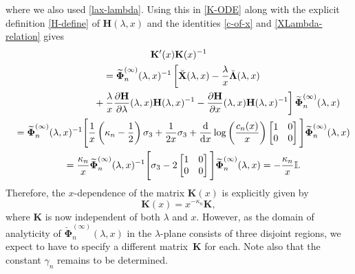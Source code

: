 \documentclass[pdftex]{sigma}
\numberwithin{equation}{section}
\newcommand{\dd}{\mathrm{d}}
\newcommand{\para}[1]{\breve{#1}}
\begin{document}
where we also used \eqref{lax-lambda}.
Using this in \eqref{K-ODE} along with the explicit definition \eqref{H-define} of $\mathbf{H}(\lambda,x)$ and the identities \eqref{c-of-x} and \eqref{XLambda-relation} gives
\begin{gather*}
 \mathbf{K}'(x)\mathbf{K}(x)^{-1}\\
\quad =\widetilde{\boldsymbol{\Phi}}_n^{(\infty)}(\lambda,x)^{-1}\left[\breve{\mathbf{X}}(\lambda,x)-\frac{\lambda}{x}\breve{\boldsymbol{\Lambda}}(\lambda,x)
\right.\\
\left.
\hphantom{\quad =\widetilde{\boldsymbol{\Phi}}_n^{(\infty)}(\lambda,x)^{-1}}{}
+\frac{\lambda}{x}\frac{\partial\mathbf{H}}{\partial\lambda}(\lambda,x)\mathbf{H}(\lambda,x)^{-1}-\frac{\partial\mathbf{H}}{\partial x}(\lambda,x)\mathbf{H}(\lambda,x)^{-1}\right]\widetilde{\boldsymbol{\Phi}}_n^{(\infty)}(\lambda,x)\\
 \quad =\widetilde{\boldsymbol\Phi}_n^{(\infty)}(\lambda,x)^{-1}\Bigg[\frac{1}{x}\left(\kappa_n-\frac{1}{2}\right)\sigma_3 +\frac{1}{2x}\sigma_3+\frac{\dd}{\dd x}\log\left(\frac{c_n(x)}{x}\right)\begin{bmatrix}1&0\\0&0\end{bmatrix}\Bigg]\widetilde{\boldsymbol{\Phi}}_n^{(\infty)}(\lambda,x)\\
 \quad=\frac{\kappa_n}{x}\widetilde{\boldsymbol{\Phi}}_n^{(\infty)}(\lambda,x)^{-1}\Bigg[\sigma_3-2
 \begin{bmatrix}1&0\\0&0\end{bmatrix}\Bigg]\widetilde{\boldsymbol{\Phi}}_n^{(\infty)}(\lambda,x)
=-\frac{\kappa_n}{x}\mathbb{I}.
\end{gather*}
Therefore, the $x$-dependence of the matrix $\mathbf{K}(x)$ is explicitly given by
\begin{equation*}
 \mathbf{K}(x)=x^{-\kappa_n}\mathbf{K},
\end{equation*}
where $\mathbf{K}$ is now independent of both $\lambda$ and $x$. However, as the domain of analyticity of $\para{\mathbf{\Phi}}_n^{(\infty)}(\lambda,x)$ in the $\lambda$-plane consists of three disjoint regions, we expect to have to specify a different matrix~$\mathbf{K}$ for each. Note also that the constant $\gamma_n$ remains to be determined.
\end{document}
